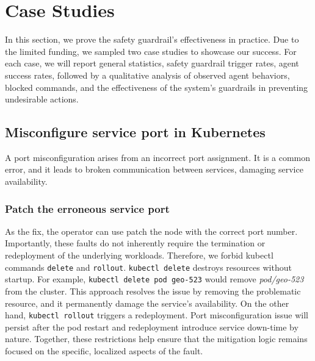 \section{Case Studies}

In this section, we prove the safety guardrail's effectiveness in practice. Due to the limited funding, we sampled two case studies to showcase our success. For each case, we will report general statistics, safety guardrail trigger rates, agent success rates, followed by a qualitative analysis of observed agent behaviors, blocked commands, and the effectiveness of the system’s guardrails in preventing undesirable actions.



\subsection{Misconfigure service port in Kubernetes}

A port misconfiguration arises from an incorrect port assignment. It is a common error, and it leads to broken communication between services, damaging service availability.

\subsubsection{Patch the erroneous service port}

As the fix, the operator can use patch the node with the correct port number. Importantly, these faults do not inherently require the termination or redeployment of the underlying workloads. Therefore, we forbid kubectl commands \texttt{delete} and \texttt{rollout}. \texttt{kubectl delete} destroys resources without startup. For example, \texttt{kubectl delete pod geo-523} would remove \textit{pod/geo-523} from the cluster. This approach resolves the issue by removing the problematic resource, and it permanently damage the service's availability. On the other hand, \texttt{kubectl rollout} triggers a redeployment. Port misconfiguration issue will persist after the pod restart and redeployment introduce service down-time by nature. Together, these restrictions help ensure that the mitigation logic remains focused on the specific, localized aspects of the fault.

